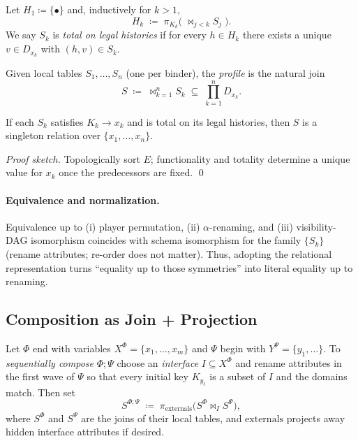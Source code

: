 \begin{definition}
Let $H_1\coloneqq\{\bullet\}$ and, inductively for $k>1$,
\[
  H_k \;\coloneqq\; \pi_{K_k}\!\Big(\; \Join_{j<k} S_j \;\Big).
\]
We say $S_k$ is \emph{total on legal histories} if for every $h\in H_k$ there
exists a unique $v\in D_{x_k}$ with $(h,v)\in S_k$.
\end{definition}

\begin{definition}
Given local tables $S_1,\ldots,S_n$ (one per binder), the \emph{profile} is
the natural join
\[
  S \;\coloneqq\; \Join_{k=1}^n S_k \;\subseteq\; \prod_{k=1}^n D_{x_k}.
\]
\end{definition}

\begin{lemma}\label{lem:determinacy}
If each $S_k$ satisfies $K_k\to x_k$ and is total on its legal histories,
then $S$ is a singleton relation over $\{x_1,\dots,x_n\}$.
\end{lemma}

\emph{Proof sketch.} Topologically sort $E$; functionality and totality
determine a unique value for $x_k$ once the predecessors are fixed.  \qed

\paragraph{Equivalence and normalization.}
Equivalence up to (i) player permutation, (ii) $\alpha$-renaming, and (iii)
visibility-DAG isomorphism coincides with schema isomorphism for the family
$\{S_k\}$ (rename attributes; re-order does not matter).  Thus, adopting the
relational representation turns “equality up to those symmetries” into
literal equality up to renaming.


\subsection{Composition as Join + Projection}\label{subsec:ra-composition}

Let $\Phi$ end with variables $X^\Phi=\{x_1,\dots,x_m\}$ and $\Psi$ begin with
$Y^\Psi=\{y_1,\dots\}$.  To \emph{sequentially compose} $\Phi;\Psi$ choose an
\emph{interface} $I\subseteq X^\Phi$ and rename attributes in the first wave
of $\Psi$ so that every initial key $K_{y_\ell}$ is a subset of $I$ and the
domains match.  Then set
\[
  S^{\Phi;\Psi} \;\coloneqq\; \pi_{\text{externals}}\!\big( S^\Phi \Join_I S^\Psi \big),
\]
where $S^\Phi$ and $S^\Psi$ are the joins of their local tables, and
$\text{externals}$ projects away hidden interface attributes if desired.

